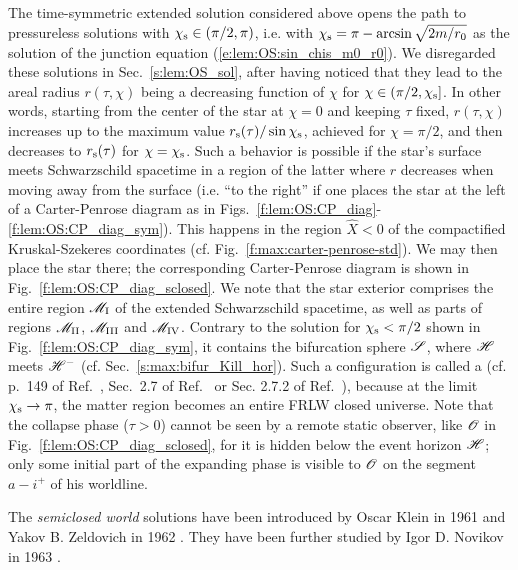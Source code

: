 \begin{remark} \label{r:lem:semiclosed}
The time-symmetric extended solution considered above opens the path
to pressureless solutions with $\chi_{\rm s} \in (\pi/2,\pi)$,
i.e. with $\chi_{\rm s} = \pi - \arcsin\sqrt{2 m/r_0}$ as the solution
of the junction equation (\ref{e:lem:OS:sin_chis_m0_r0}).
We disregarded these solutions in Sec.~\ref{s:lem:OS_sol}, after having noticed
that they lead to the areal radius $r(\tau,\chi)$ being a decreasing function of $\chi$ for
$\chi\in (\pi/2, \chi_{\rm s}]$. In other words, starting from the center of the
star at $\chi = 0$ and keeping $\tau$ fixed, $r(\tau,\chi)$ increases up to the maximum value
$r_{\rm s}(\tau)/\sin\chi_{\rm s}$,
achieved for $\chi=\pi/2$, and then decreases
to $r_{\rm s}(\tau)$ for $\chi = \chi_{\rm s}$. Such a behavior
is possible if the star's surface meets Schwarzschild spacetime in a region
of the latter where $r$ decreases when moving away from the surface (i.e.
``to the right'' if one places the star at the left of a Carter-Penrose diagram
as in Figs.~\ref{f:lem:OS:CP_diag}-\ref{f:lem:OS:CP_diag_sym}).
This happens in the region $\hat{X} < 0$ of the compactified
Kruskal-Szekeres coordinates (cf. Fig.~\ref{f:max:carter-penrose-std}).
We may then place the star there; the corresponding
Carter-Penrose diagram is shown in Fig.~\ref{f:lem:OS:CP_diag_sclosed}.
We note that the star exterior comprises the entire region $\mathscr{M}_{\rm I}$  of
the extended Schwarzschild spacetime, as well as parts of regions $\mathscr{M}_{\rm II}$,
$\mathscr{M}_{\rm III}$ and  $\mathscr{M}_{\rm IV}$. Contrary to the solution
for $\chi_{\rm s} < \pi/2$ shown in Fig.~\ref{f:lem:OS:CP_diag_sym}, it
contains the bifurcation sphere $\mathscr{S}$, where $\mathscr{H}$ meets $\mathscr{H}^-$
(cf. Sec.~\ref{s:max:bifur_Kill_hor}). Such a configuration is called a  (cf. p.~149 of Ref.~\cite{ZeldoN83}, Sec.~2.7 of Ref.~\cite{NovikF89}
or Sec. 2.7.2 of Ref.~\cite{FroloN98}), because at the limit $\chi_{\rm s} \to \pi$, the
matter region becomes an entire FRLW closed universe.
Note that the collapse phase ($\tau > 0$) cannot be seen by a remote static observer, like $\mathscr{O}$ in Fig.~\ref{f:lem:OS:CP_diag_sclosed}, for it is hidden below
the event horizon $\mathscr{H}$; only some initial part of the expanding phase is visible to $\mathscr{O}$
on the segment $a - i^+$ of his worldline.
\end{remark}

\begin{hist}
The \emph{semiclosed world} solutions have been introduced by Oscar Klein
in 1961 \cite{Klein61} and Yakov B. Zeldovich in 1962 \cite{Zeldo62}.
They have been further studied by Igor D. Novikov in 1963 \cite{Novik63}.
\end{hist}


